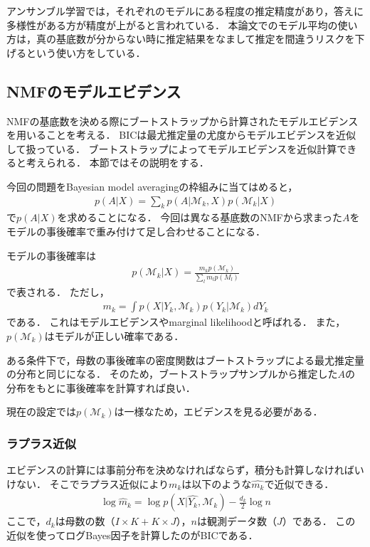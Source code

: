アンサンブル学習では，それぞれのモデルにある程度の推定精度があり\cite{Kittler1998}，答えに多様性がある方が精度が上がる\cite{Kuncheva2006}と言われている．
本論文でのモデル平均の使い方は，真の基底数が分からない時に推定結果をなまして推定を間違うリスクを下げるという使い方をしている．

\subsection{NMFのモデルエビデンス}
NMFの基底数を決める際にブートストラップから計算されたモデルエビデンスを用いることを考える．
BICは最尤推定量の尤度からモデルエビデンスを近似して扱っている．
ブートストラップによってモデルエビデンスを近似計算できると考えられる．
本節ではその説明をする．

今回の問題をBayesian model averagingの枠組みに当てはめると，
\begin{eqnarray}
	p(A|X) = \sum_k p(A|\mathcal{M}_k, X) p(\mathcal{M}_k | X)
\end{eqnarray}
で$p(A|X)$を求めることになる．
今回は異なる基底数のNMFから求まった$A$をモデルの事後確率で重み付けて足し合わせることになる．

モデルの事後確率は
\begin{eqnarray}
	p(\mathcal{M}_k|X) = \frac{m_k p(\mathcal{M}_k)}{\sum_l m_l p(M_l)}
\end{eqnarray}
で表される．
ただし，
\begin{eqnarray}
	m_k = \int p(X | Y_k, \mathcal{M}_k) p(Y_k| \mathcal{M}_k) dY_k
	\label{eq:evidence}
\end{eqnarray}
である．
これはモデルエビデンスやmarginal likelihoodと呼ばれる．
また，$p(\mathcal{M}_k)$はモデルが正しい確率である．

ある条件下で，母数の事後確率の密度関数はブートストラップによる最尤推定量の分布と同じになる．
そのため，ブートストラップサンプルから推定した$A$の分布をもとに事後確率を計算すれば良い．

現在の設定では$p(\mathcal{M}_k)$は一様なため，エビデンスを見る必要がある．

\subsubsection{ラプラス近似}
エビデンスの計算には事前分布を決めなければならず，積分も計算しなければいけない．
そこでラプラス近似により$m_k$は以下のような$\hat{m_k}$で近似できる．
\begin{eqnarray}
	\log \hat{m}_k = \log p(X | \hat{Y_k}, \mathcal{M}_k) - \frac{d_k}{2} \log n
	\label{eq:simm}
\end{eqnarray}
ここで，$d_k$は母数の数（$I \times K + K \times J$），$n$は観測データ数（$J$）である．
この近似を使ってログBayes因子を計算したのがBICである．

